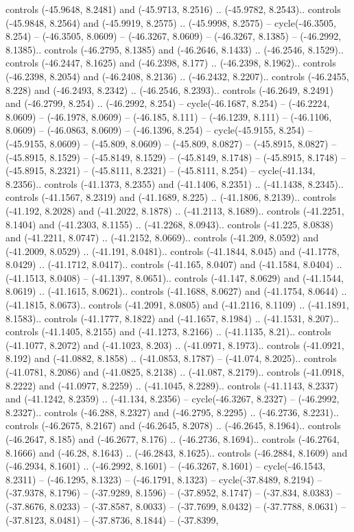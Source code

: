 \begin{scope}[shift={(2.5552, 9.9912)}]
\begin{scope}[shift={(48.1654, -14.8546)}]
controls (-45.9648, 8.2481) and (-45.9713, 8.2516) .. (-45.9782, 8.2543).. controls (-45.9848, 8.2564) and (-45.9919, 8.2575) .. (-45.9998, 8.2575) -- cycle(-46.3505, 8.254) -- (-46.3505, 8.0609) -- (-46.3267, 8.0609) -- (-46.3267, 8.1385) -- (-46.2992, 8.1385).. controls (-46.2795, 8.1385) and (-46.2646, 8.1433) .. (-46.2546, 8.1529).. controls (-46.2447, 8.1625) and (-46.2398, 8.177) .. (-46.2398, 8.1962).. controls (-46.2398, 8.2054) and (-46.2408, 8.2136) .. (-46.2432, 8.2207).. controls (-46.2455, 8.228) and (-46.2493, 8.2342) .. (-46.2546, 8.2393).. controls (-46.2649, 8.2491) and (-46.2799, 8.254) .. (-46.2992, 8.254) -- cycle(-46.1687, 8.254) -- (-46.2224, 8.0609) -- (-46.1978, 8.0609) -- (-46.185, 8.111) -- (-46.1239, 8.111) -- (-46.1106, 8.0609) -- (-46.0863, 8.0609) -- (-46.1396, 8.254) -- cycle(-45.9155, 8.254) -- (-45.9155, 8.0609) -- (-45.809, 8.0609) -- (-45.809, 8.0827) -- (-45.8915, 8.0827) -- (-45.8915, 8.1529) -- (-45.8149, 8.1529) -- (-45.8149, 8.1748) -- (-45.8915, 8.1748) -- (-45.8915, 8.2321) -- (-45.8111, 8.2321) -- (-45.8111, 8.254) -- cycle(-41.134, 8.2356).. controls (-41.1373, 8.2355) and (-41.1406, 8.2351) .. (-41.1438, 8.2345).. controls (-41.1567, 8.2319) and (-41.1689, 8.225) .. (-41.1806, 8.2139).. controls (-41.192, 8.2028) and (-41.2022, 8.1878) .. (-41.2113, 8.1689).. controls (-41.2251, 8.1404) and (-41.2303, 8.1155) .. (-41.2268, 8.0943).. controls (-41.225, 8.0838) and (-41.2211, 8.0747) .. (-41.2152, 8.0669).. controls (-41.209, 8.0592) and (-41.2009, 8.0529) .. (-41.191, 8.0481).. controls (-41.1844, 8.045) and (-41.1778, 8.0429) .. (-41.1712, 8.0417).. controls (-41.165, 8.0407) and (-41.1584, 8.0404) .. (-41.1513, 8.0408) -- (-41.1397, 8.0651).. controls (-41.147, 8.0629) and (-41.1544, 8.0619) .. (-41.1615, 8.0621).. controls (-41.1688, 8.0627) and (-41.1754, 8.0644) .. (-41.1815, 8.0673).. controls (-41.2091, 8.0805) and (-41.2116, 8.1109) .. (-41.1891, 8.1583).. controls (-41.1777, 8.1822) and (-41.1657, 8.1984) .. (-41.1531, 8.207).. controls (-41.1405, 8.2155) and (-41.1273, 8.2166) .. (-41.1135, 8.21).. controls (-41.1077, 8.2072) and (-41.1023, 8.203) .. (-41.0971, 8.1973).. controls (-41.0921, 8.192) and (-41.0882, 8.1858) .. (-41.0853, 8.1787) -- (-41.074, 8.2025).. controls (-41.0781, 8.2086) and (-41.0825, 8.2138) .. (-41.087, 8.2179).. controls (-41.0918, 8.2222) and (-41.0977, 8.2259) .. (-41.1045, 8.2289).. controls (-41.1143, 8.2337) and (-41.1242, 8.2359) .. (-41.134, 8.2356) -- cycle(-46.3267, 8.2327) -- (-46.2992, 8.2327).. controls (-46.288, 8.2327) and (-46.2795, 8.2295) .. (-46.2736, 8.2231).. controls (-46.2675, 8.2167) and (-46.2645, 8.2078) .. (-46.2645, 8.1964).. controls (-46.2647, 8.185) and (-46.2677, 8.176) .. (-46.2736, 8.1694).. controls (-46.2764, 8.1666) and (-46.28, 8.1643) .. (-46.2843, 8.1625).. controls (-46.2884, 8.1609) and (-46.2934, 8.1601) .. (-46.2992, 8.1601) -- (-46.3267, 8.1601) -- cycle(-46.1543, 8.2311) -- (-46.1295, 8.1323) -- (-46.1791, 8.1323) -- cycle(-37.8489, 8.2194) -- (-37.9378, 8.1796) -- (-37.9289, 8.1596) -- (-37.8952, 8.1747) -- (-37.834, 8.0383) -- (-37.8676, 8.0233) -- (-37.8587, 8.0033) -- (-37.7699, 8.0432) -- (-37.7788, 8.0631) -- (-37.8123, 8.0481) -- (-37.8736, 8.1844) -- (-37.8399, 
\end{scope}
\end{scope}
